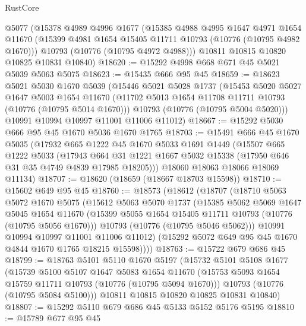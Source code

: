 \begin{lexlean}{RustCore}
\begin{coremodule}
    @5077
    (@15378
      @4989
      @4996
      @1677
      (@15385
        @4988
        @4995
        @1647
        @4971
        @1654
        @11670
        (@15399 @4981 @1654 @15405 @11711 @10793 (@10776 (@10795 @4982 @1670)))
        @10793
        (@10776 (@10795 @4972 @4988)))
      @10811
      @10815
      @10820
      @10825
      @10831
      @10840)
@18620 := @15292 @4998 @668 @671 @45 @5021 @5039 @5063 @5075
@18623 := @15435 @666 @95 @45
@18659 := @18623
    @5021
    @5030
    @1670
    @5039
    (@15446
      @5021
      @5028
      @1737
      (@15453
        @5020
        @5027
        @1647
        @5003
        @1654
        @11670
        (@11702 @5013 @1654 @11708 @11711 @10793 (@10776 (@10795 @5014 @1670)))
        @10793
        (@10776 (@10795 @5004 @5020)))
      @10991
      @10994
      @10997
      @11001
      @11006
      @11012)
@18667 := @15292 @5030 @666 @95 @45 @1670 @5036 @1670 @1765
@18703 := @15491
    @666
    @45
    @1670
    @5035
    (@17932
      @665
      @1222
      @45
      @1670
      @5033
      @1691
      @1449
      (@15507
        @665
        @1222
        @5033
        (@17943 @664 @31 @1221 @1667 @5032 @15338 (@17950 @646 @31 @35 @4749 @4839 @17985 @18205)))
      @18060
      @18063
      @18066
      @18069
      @11134)
@18707 := @18620 (@18659 (@18667 @18703 @15598))
@18710 := @15602 @649 @95 @45
@18760 := @18573
    (@18612
      (@18707
        (@18710
          @5063
          @5072
          @1670
          @5075
          (@15612
            @5063
            @5070
            @1737
            (@15385
              @5062
              @5069
              @1647
              @5045
              @1654
              @11670
              (@15399 @5055 @1654 @15405 @11711 @10793 (@10776 (@10795 @5056 @1670)))
              @10793
              (@10776 (@10795 @5046 @5062)))
            @10991
            @10994
            @10997
            @11001
            @11006
            @11012)
          (@15292 @5072 @649 @95 @45 @1670 @4844 @1670 @1765 @18215 @15598))))
@18763 := @15722 @679 @686 @45
@18799 := @18763
    @5101
    @5110
    @1670
    @5197
    (@15732
      @5101
      @5108
      @1677
      (@15739
        @5100
        @5107
        @1647
        @5083
        @1654
        @11670
        (@15753 @5093 @1654 @15759 @11711 @10793 (@10776 (@10795 @5094 @1670)))
        @10793
        (@10776 (@10795 @5084 @5100)))
      @10811
      @10815
      @10820
      @10825
      @10831
      @10840)
@18807 := @15292 @5110 @679 @686 @45 @5133 @5152 @5176 @5195
@18810 := @15789 @677 @95 @45

\end{coremodule}
\end{lexlean}
